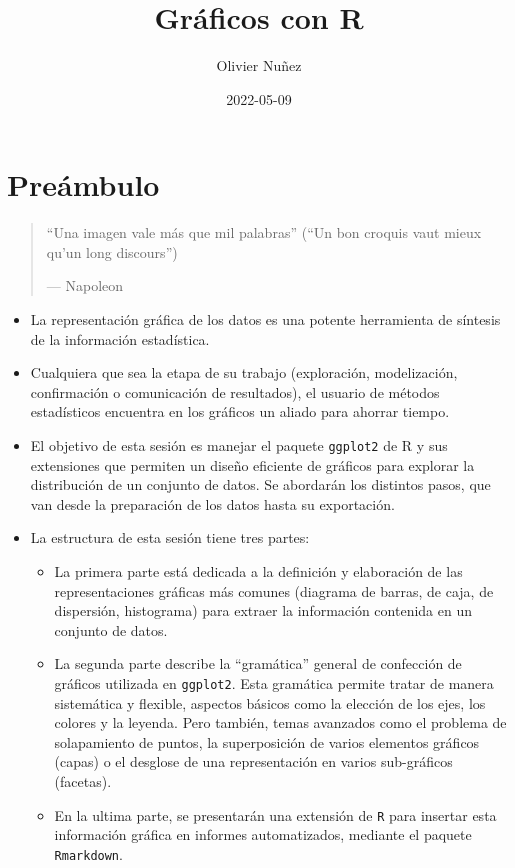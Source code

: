 \documentclass[
]{article}
\title{Gráficos con R}
\author{Olivier Nuñez}
\date{2022-05-09}
\providecommand{\tightlist}{%
  \setlength{\itemsep}{0pt}\setlength{\parskip}{0pt}}
\numberwithin{ejcnt}{section}
\begin{document}
\maketitle

{
\setcounter{tocdepth}{2}
\tableofcontents
}
\hypertarget{preuxe1mbulo}{%
\section*{Preámbulo}\label{preuxe1mbulo}}

\begin{quote}
``Una imagen vale más que mil palabras'' (``Un bon croquis vaut mieux qu'un long discours'')

--- Napoleon
\end{quote}

\begin{itemize}
\item
  La representación gráfica de los datos es una potente herramienta de síntesis de la información estadística.
\item
  Cualquiera que sea la etapa de su trabajo (exploración, modelización, confirmación o comunicación de resultados), el usuario de métodos estadísticos encuentra en los gráficos un aliado para ahorrar tiempo.
\item
  El objetivo de esta sesión es manejar el paquete \texttt{ggplot2} de R y sus extensiones que permiten un diseño eficiente de gráficos para explorar la distribución de un conjunto de datos. Se abordarán los distintos pasos, que van desde la preparación de los datos hasta su exportación.
\item
  La estructura de esta sesión tiene tres partes:

  \begin{itemize}
  \tightlist
  \item
    La primera parte está dedicada a la definición y elaboración de las representaciones gráficas más comunes (diagrama de barras, de caja, de dispersión, histograma) para extraer la información contenida en un conjunto de datos.
  \item
    La segunda parte describe la ``gramática'' general de confección de gráficos utilizada en \texttt{ggplot2}. Esta gramática permite tratar de manera sistemática y flexible, aspectos básicos como la elección de los ejes, los colores y la leyenda. Pero también, temas avanzados como el problema de solapamiento de puntos, la superposición de varios elementos gráficos (capas) o el desglose de una representación en varios sub-gráficos (facetas).
  \item
    En la ultima parte, se presentarán una extensión de \texttt{R} para insertar esta información gráfica en informes automatizados, mediante el paquete \texttt{Rmarkdown}.
  \end{itemize}
\end{itemize}
\end{document}
